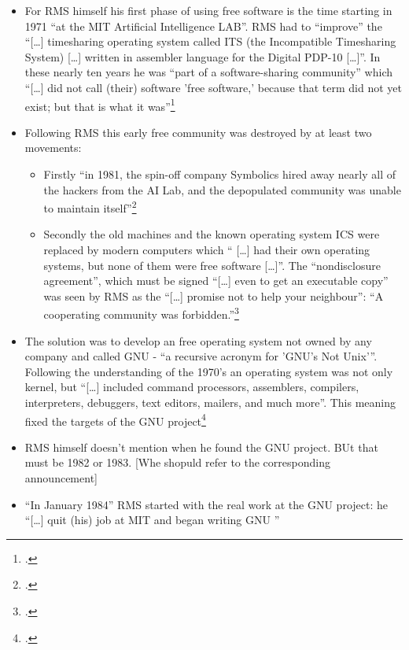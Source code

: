 \documentclass[DIV=calc,BCOR=5mm,11pt,headings=small,oneside,abstract=true, toc=bib]{scrartcl}
\begin{document}
\begin{itemize}
  \item For RMS himself his first phase of using free software is the time
  starting in 1971 \enquote{at the MIT Artificial Intelligence LAB}. RMS had
  to \enquote{improve} the \enquote{[\ldots] timesharing operating system
  called ITS (the Incompatible Timesharing System) [\ldots] written in assembler
  language for the Digital PDP-10 [\ldots]}. In these nearly ten years he
  was \enquote{part of a software-sharing community} which \enquote{[\ldots] did
  not call (their) software ’free software,’ because that term did not yet
  exist; but that is what it was}\footcite[cf][15]{Stallman1999a}
  \item Following RMS this early free community was destroyed by at least two
  movements:
  \begin{itemize}
  	\item Firstly \enquote{in 1981, the spin-off company Symbolics hired away nearly
  	all of the hackers from the AI Lab, and the depopulated community was unable to
  	maintain itself}\footcite[cf][15]{Stallman1999a}
  	\item Secondly the old machines and the known operating system ICS were
  	replaced by modern computers which \enquote{ [\ldots] had their own operating
  	systems, but none of them were free software [\ldots]}. The
  	\enquote{nondisclosure agreement}, which must be signed \enquote{[\ldots]
  	even to get an executable copy} was seen by RMS as the \enquote{[\ldots]
  	promise not to help your neighbour}: \enquote{A cooperating community was
  	forbidden.}\footcite[cf][16]{Stallman1999a}
  \end{itemize}
  \item The solution was to develop an free operating system not owned by any
  company and called GNU - \enquote{a recursive acronym for ’GNU’s Not
  Unix’}. Following the understanding of the 1970’s an operating system
  was not only kernel, but \enquote{[\ldots] included command processors,
  assemblers, compilers, interpreters, debuggers, text editors, mailers, and
  much more}. This meaning fixed the targets of the GNU
  project\footcite[cf][17]{Stallman1999a}
  \item RMS himself doesn’t mention when he found the GNU project. BUt that must
  be 1982 or 1983. [Whe shopuld refer to the corresponding announcement]
  \item \enquote{In January 1984} RMS started with the real work at the GNU
  project: he \enquote{[\ldots] quit (his) job at MIT and began writing GNU
}
\end{itemize}
\end{document}
